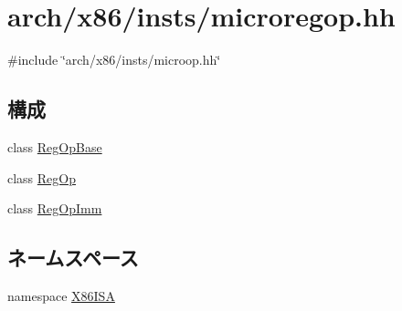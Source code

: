 \hypertarget{microregop_8hh}{
\section{arch/x86/insts/microregop.hh}
\label{microregop_8hh}
}
{\ttfamily \#include \char`\"{}arch/x86/insts/microop.hh\char`\"{}}\par
\subsection*{構成}
\begin{DoxyCompactItemize}
\item 
class \hyperlink{classX86ISA_1_1RegOpBase}{RegOpBase}
\item 
class \hyperlink{classX86ISA_1_1RegOp}{RegOp}
\item 
class \hyperlink{classX86ISA_1_1RegOpImm}{RegOpImm}
\end{DoxyCompactItemize}
\subsection*{ネームスペース}
\begin{DoxyCompactItemize}
\item 
namespace \hyperlink{namespaceX86ISA}{X86ISA}
\end{DoxyCompactItemize}
